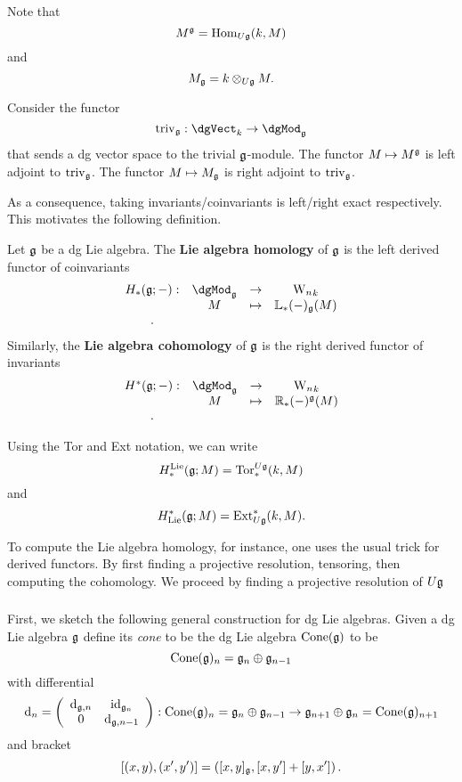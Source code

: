 \documentclass[11pt]{amsart}
\begin{document}
\begin{rmk}
Note that 
\[
M^\mathfrak g = {\rm Hom}_{U \mathfrak g}(k, M)
\]
and 
\[
M_\mathfrak g = k \otimes_{U \mathfrak g} M .
\] 
\end{rmk}

\begin{lem}
Consider the functor
\[
{\rm triv}_\fg : \dgVect_k \to \dgMod_\fg
\]
that sends a dg vector space to the trivial $\mathfrak g$-module.
The functor $M \mapsto M^\mathfrak g$ is left adjoint to ${\rm triv}_\mathfrak g$. 
The functor $M \mapsto M_\mathfrak g$ is right adjoint to ${\rm triv}_\mathfrak g$. 
\end{lem}

As a consequence, taking invariants/coinvariants is left/right exact respectively. 
This motivates the following definition. 

\begin{dfn}
Let $\mathfrak g$ be a dg Lie algebra.
The {\bf Lie algebra homology} of $\mathfrak g$ is the left derived functor of coinvariants
\[
\begin{array}{cccc}
H_*(\fg ; -) : & \dgMod_\fg & \to & \Vect_k \\ 
& M & \mapsto & \LL_*(-)_\fg (M) \\ .
\end{array}
\]
Similarly, the {\bf Lie algebra cohomology} of $\mathfrak g$ is the right derived functor of invariants
\[
\begin{array}{cccc}
H^*(\fg ; -) : & \dgMod_\fg & \to & \Vect_k \\ 
& M & \mapsto & \RR_*(-)^\fg (M) \\ .
\end{array}
\]
\end{dfn}

\begin{rmk}
Using the Tor and Ext notation, we can write
\[
H^{\rm Lie}_*(\mathfrak g ; M) = {\rm Tor}^{U \mathfrak g}_* (k, M)
\]
and 
\[
H_{\rm Lie}^*(\mathfrak g ; M) = {\rm Ext}^*_{U \mathfrak g}(k, M) .
\] 
\end{rmk}

To compute the Lie algebra homology, for instance, one uses the usual trick for derived functors. 
By first finding a projective resolution, tensoring, then computing the cohomology. 
We proceed by finding a projective resolution of $U\mathfrak g$ 

\subsubsection{}

First, we sketch the following general construction for dg Lie algebras.
Given a dg Lie algebra $\mathfrak g$ define its {\em cone} to be the dg Lie algebra ${\rm Cone}(\mathfrak g)$ to be
\[
{\rm Cone}(\mathfrak g)_n = \mathfrak g_n \oplus \mathfrak g_{n-1}
\]
with differential
\[
{\rm d}_n = \left(\begin{array}{cc} {\rm d}_{\mathfrak g,n} & {\rm id}_{\mathfrak g_{n}} \\ 0 & {\rm d}_{\mathfrak g, n-1} \end{array}\right) : {\rm Cone}(\mathfrak g)_{n} = \mathfrak g_n \oplus \mathfrak g_{n-1} \to \mathfrak g_{n+1} \oplus \mathfrak g_n = {\rm Cone}(\mathfrak g)_{n+1}
\]
and bracket
\[
[(x,y), (x',y')] = \left([x,y]_{\mathfrak g}, [x,y'] + [y,x']\right) .
\]
\end{document}
